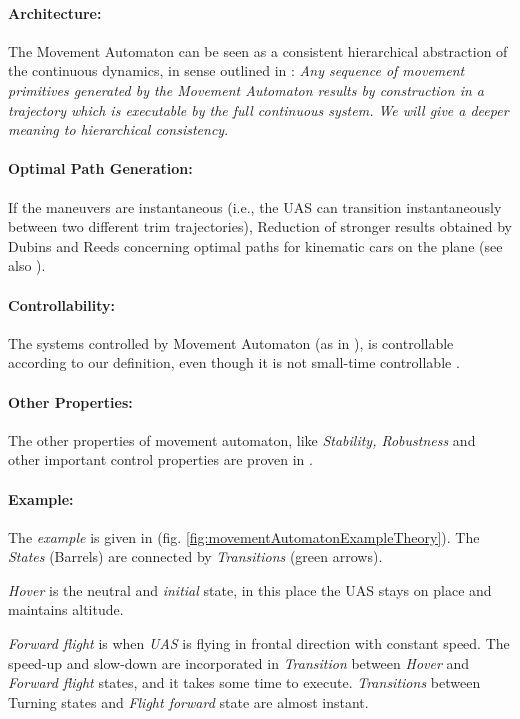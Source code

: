 \paragraph{Architecture:} The Movement Automaton can be seen as a consistent hierarchical abstraction of the continuous dynamics, in sense outlined in \cite{pappas2000hierarchically}: \emph{Any sequence of movement primitives generated by the Movement Automaton results by construction in a trajectory which is executable by the full continuous system. We will give a deeper meaning to hierarchical consistency}. 

\paragraph{Optimal Path Generation:} If the maneuvers are instantaneous (i.e., the UAS can transition instantaneously between two different trim trajectories), Reduction of stronger results obtained by Dubins \cite{dubins1957curves} and Reeds \cite{reeds1990optimal} concerning optimal paths for kinematic cars on the plane (see also \cite{soueres1998optimal}). 

\paragraph{Controllability:} The systems controlled by Movement Automaton (as in \cite{lavalle1998rapidly}), is controllable according to our definition, even though it is not
small-time controllable \cite{sussmann1983lie}.

\paragraph{Other Properties:} The other properties of movement automaton, like \emph{Stability, Robustness} and other important control properties are proven in \cite{frazzoli2001robust}.


\paragraph{Example:} The \emph{example} is given in (fig. \ref{fig:movementAutomatonExampleTheory}). The \emph{States} (Barrels) are connected by \emph{Transitions} (green arrows).

\emph{Hover} is the neutral and \emph{initial} state, in this place the UAS stays on place and maintains altitude.

\emph{Forward flight} is when \emph{UAS} is flying in frontal direction with constant speed. The speed-up and slow-down are incorporated in \emph{Transition} between \emph{Hover} and \emph{Forward flight} states, and it takes some time to execute. \emph{Transitions} between Turning states and \emph{Flight forward} state are almost instant. 

